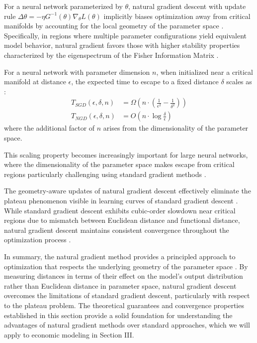 \documentclass[a4paper]{article}
\begin{document}
\begin{theorem}
For a neural network parameterized by $\theta$, natural gradient descent with update rule $\Delta\theta = -\eta G^{-1}(\theta)\nabla_\theta L(\theta)$ implicitly biases optimization away from critical manifolds by accounting for the local geometry of the parameter space \cite{amari2016information, kunstner2019limitations}. Specifically, in regions where multiple parameter configurations yield equivalent model behavior, natural gradient favors those with higher stability properties characterized by the eigenspectrum of the Fisher Information Matrix \cite{liang2019fisher, martens2020new}.
\end{theorem}

\begin{corollary}
For a neural network with parameter dimension $n$, when initialized near a critical manifold at distance $\epsilon$, the expected time to escape to a fixed distance $\delta$ scales as \cite{zhang2019fast, martens2020new}:
\begin{align}
T_{SGD}(\epsilon, \delta, n) &= \Omega\left(n \cdot \left(\frac{1}{\epsilon^2} - \frac{1}{\delta^2}\right)\right) \\
T_{NGD}(\epsilon, \delta, n) &= O\left(n \cdot \log\frac{\delta}{\epsilon}\right)
\end{align}
where the additional factor of $n$ arises from the dimensionality of the parameter space.
\end{corollary}

This scaling property becomes increasingly important for large neural networks, where the dimensionality of the parameter space makes escape from critical regions particularly challenging using standard gradient methods \cite{martens2015optimizing}.

The geometry-aware updates of natural gradient descent effectively eliminate the plateau phenomenon visible in learning curves of standard gradient descent \cite{pascanu2014saddle}. While standard gradient descent exhibits cubic-order slowdown near critical regions due to mismatch between Euclidean distance and functional distance, natural gradient descent maintains consistent convergence throughout the optimization process \cite{martens2010deep, martens2015optimizing}.

In summary, the natural gradient method provides a principled approach to optimization that respects the underlying geometry of the parameter space \cite{amari1998natural, amari2000methods}. By measuring distances in terms of their effect on the model's output distribution rather than Euclidean distance in parameter space, natural gradient descent overcomes the limitations of standard gradient descent, particularly with respect to the plateau problem. The theoretical guarantees and convergence properties established in this section provide a solid foundation for understanding the advantages of natural gradient methods over standard approaches, which we will apply to economic modeling in Section III.
\end{document}
